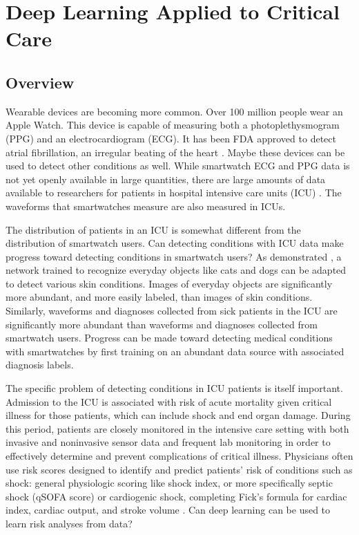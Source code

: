 \chapter{Deep Learning Applied to Critical Care}

\section{Overview}
Wearable devices are becoming more common.  Over 100 million people wear an Apple Watch.  This device is capable of measuring both a photoplethysmogram (PPG) and an electrocardiogram (ECG).  It has been FDA approved to detect atrial fibrillation, an irregular beating of the heart \cite{perez2019large}.  Maybe these devices can be used to detect other conditions as well.  While smartwatch ECG and PPG data is not yet openly available in large quantities, there are large amounts of data available to researchers for patients in hospital intensive care units (ICU) \cite{johnson2016mimic}.  The waveforms that smartwatches measure are also measured in ICUs.

The distribution of patients in an ICU is somewhat different from the distribution of smartwatch users.  Can detecting conditions with ICU data make progress toward detecting conditions in smartwatch users?  As demonstrated \cite{kuprel2017dermatologist}, a network trained to recognize everyday objects like cats and dogs can be adapted to detect various skin conditions.  Images of everyday objects are significantly more abundant, and more easily labeled, than images of skin conditions.  Similarly, waveforms and diagnoses collected from sick patients in the ICU are significantly more abundant than waveforms and diagnoses collected from smartwatch users.  Progress can be made toward detecting medical conditions with smartwatches by first training on an abundant data source with associated diagnosis labels.  

The specific problem of detecting conditions in ICU patients is itself important.  Admission to the ICU is associated with risk of acute mortality given critical illness for those patients, which can include shock and end organ damage. During this period, patients are closely monitored in the intensive care setting with both invasive and noninvasive sensor data and frequent lab monitoring in order to effectively determine and prevent complications of critical illness.  Physicians often use risk scores designed to identify and predict patients’ risk of conditions such as shock: general physiologic scoring like shock index, or more specifically septic shock (qSOFA score) \cite{seymour2016assessment} or cardiogenic shock, completing Fick’s formula for cardiac index, cardiac output, and stroke volume \cite{fick1870ueber}.  Can deep learning can be used to learn risk analyses from data?

